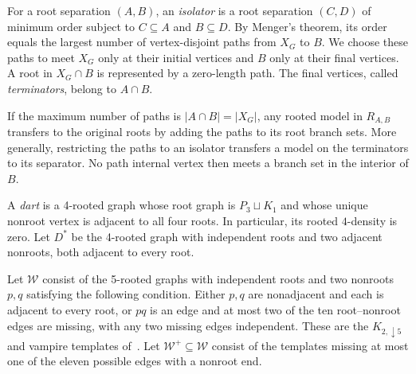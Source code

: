 \documentclass[11pt]{article}
\theoremstyle{remark}
\numberwithin{equation}{section}
\newcommand{\W}{\mathcal W}
\begin{document}
For a root separation $(A,B)$, an \emph{isolator} is a root separation $(C,D)$ of minimum order subject to $C\subseteq A$ and $B\subseteq D$. By Menger's theorem, its order equals the largest number of vertex-disjoint paths from $X_G$ to $B$. We choose these paths to meet $X_G$ only at their initial vertices and $B$ only at their final vertices. A root in $X_G\cap B$ is represented by a zero-length path. The final vertices, called \emph{terminators}, belong to $A\cap B$.

If the maximum number of paths is $|A\cap B|=|X_G|$, any rooted model in $R_{A,B}$ transfers to the original roots by adding the paths to its root branch sets. More generally, restricting the paths to an isolator transfers a model on the terminators to its separator. No path internal vertex then meets a branch set in the interior of $B$.

A \emph{dart} is a 4-rooted graph whose root graph is $P_3\sqcup K_1$ and whose unique nonroot vertex is adjacent to all four roots. In particular, its rooted $4$-density is zero. Let $D^*$ be the 4-rooted graph with independent roots and two adjacent nonroots, both adjacent to every root.

Let $\W$ consist of the 5-rooted graphs with independent roots and two nonroots $p,q$ satisfying the following condition. Either $p,q$ are nonadjacent and each is adjacent to every root, or $pq$ is an edge and at most two of the ten root--nonroot edges are missing, with any two missing edges independent. These are the $K_{2,\downarrow5}$ and vampire templates of~\cite{DNR26}. Let $\W^+\subseteq\W$ consist of the templates missing at most one of the eleven possible edges with a nonroot end.
\end{document}

